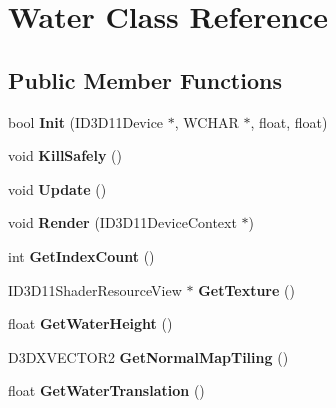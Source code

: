 \hypertarget{class_water}{\section{Water Class Reference}
\label{class_water}
}
\subsection*{Public Member Functions}
\begin{DoxyCompactItemize}
\item 
\hypertarget{class_water_a17ec458573a4d0da6f94dfee96feae21}{bool {\bfseries Init} (I\-D3\-D11\-Device $\ast$, W\-C\-H\-A\-R $\ast$, float, float)}\label{class_water_a17ec458573a4d0da6f94dfee96feae21}

\item 
\hypertarget{class_water_a0b34708b5bd6ad2342403d9af5844b1e}{void {\bfseries Kill\-Safely} ()}\label{class_water_a0b34708b5bd6ad2342403d9af5844b1e}

\item 
\hypertarget{class_water_a3d185dc0ca493e71a1c42ae050fa1041}{void {\bfseries Update} ()}\label{class_water_a3d185dc0ca493e71a1c42ae050fa1041}

\item 
\hypertarget{class_water_acb5e25241fcbc1ce37cac9b7409f7c7b}{void {\bfseries Render} (I\-D3\-D11\-Device\-Context $\ast$)}\label{class_water_acb5e25241fcbc1ce37cac9b7409f7c7b}

\item 
\hypertarget{class_water_a4b6fcb888f68301d6e42697f95bef175}{int {\bfseries Get\-Index\-Count} ()}\label{class_water_a4b6fcb888f68301d6e42697f95bef175}

\item 
\hypertarget{class_water_aefb5c5a67d9cda25fb65419f63fae4c3}{I\-D3\-D11\-Shader\-Resource\-View $\ast$ {\bfseries Get\-Texture} ()}\label{class_water_aefb5c5a67d9cda25fb65419f63fae4c3}

\item 
\hypertarget{class_water_a5e9175dd4d2af165c0a3eb07031d51a1}{float {\bfseries Get\-Water\-Height} ()}\label{class_water_a5e9175dd4d2af165c0a3eb07031d51a1}

\item 
\hypertarget{class_water_a69e08a50943625efec9956379763fb68}{D3\-D\-X\-V\-E\-C\-T\-O\-R2 {\bfseries Get\-Normal\-Map\-Tiling} ()}\label{class_water_a69e08a50943625efec9956379763fb68}

\item 
\hypertarget{class_water_ad39f1d69995d3abcf8cb6e12fedaf9df}{float {\bfseries Get\-Water\-Translation} ()}\label{class_water_ad39f1d69995d3abcf8cb6e12fedaf9df}


\end{DoxyCompactItemize}
